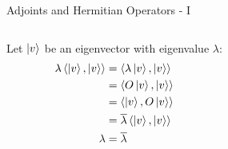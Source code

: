 \documentclass{beamer}
\begin{document}
\begin{frame}{Adjoints and Hermitian Operators - I}
{\begin{columns}
    \begin{block}{}
    Let $\ket{v}$ be an eigenvector with eigenvalue $\lambda$:
    \begin{align*}
      \lambda \braket{\ket{v}, \ket{v}}
      &= \braket{\lambda \ket{v}, \ket{v}} \\
      &= \braket{O \ket{v}, \ket{v}} \\
      &= \braket{\ket{v}, O \ket{v}} \\
      &= \overline{\lambda} \braket{\ket{v}, \ket{v}} \\
      \lambda &= \overline{\lambda}
    \end{align*}
    \end{block}

    \end{columns}
  }%
\end{frame}
\end{document}
